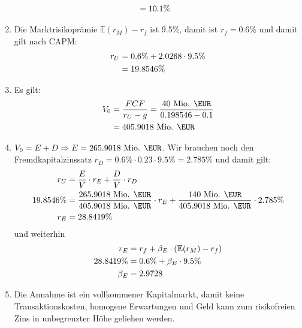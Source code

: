 \documentclass{article}
\newcommand{\E}{\mathbb{E}}
\begin{document}
\begin{enumerate}[label=(\alph*)]
\begin{align}
			&= 10.1\% \notag
		\end{align}
		\item Die Marktrisikoprämie $\E(r_M)-r_f$ ist 9.5\%, damit ist $r_f=0.6\%$ und damit gilt nach CAPM:
		\begin{align}
			r_U &= 0.6\% + 2.0268\cdot 9.5\% \notag \\
			&= 19.8546\% \notag
		\end{align}
		\item Es gilt:
		\begin{align}
			V_0 &= \frac{FCF}{r_U-g} = \frac{40\text{ Mio. \EUR}}{0.198546 - 0.1} \notag \\
			&= 405.9018\text{ Mio. \EUR} \notag
		\end{align}
		\item $V_0 = E + D \Rightarrow E = 265.9018\text{ Mio. \EUR}$. Wir brauchen noch den Fremdkapitalzinssatz $r_D = 0.6\%\cdot 0.23\cdot 9.5\% = 2.785\%$ und damit gilt:
		\begin{align}
			r_U &= \frac{E}{V}\cdot r_E + \frac{D}{V}\cdot r_D \notag \\
			19.8546\% &= \frac{265.9018\text{ Mio. \EUR}}{405.9018\text{ Mio. \EUR}}\cdot r_E + \frac{140\text{ Mio. \EUR}}{405.9018\text{ Mio. \EUR}}\cdot 2.785\% \notag \\
			r_E &= 28.8419\% \notag
		\end{align}
		und weiterhin
		\begin{align}
			r_E &= r_f + \beta_E\cdot (\E(r_M) - r_f) \notag \\
			28.8419\% &= 0.6\% + \beta_E\cdot 9.5\% \notag \\
			\beta_E &= 2.9728\notag
		\end{align}
		\item Die Annahme ist ein vollkommener Kapitalmarkt, damit keine Transaktionskosten, homogene Erwartungen und Geld kann zum risikofreien Zins in unbegrenzter Höhe geliehen werden.
	\end{enumerate}
	
\end{document}
